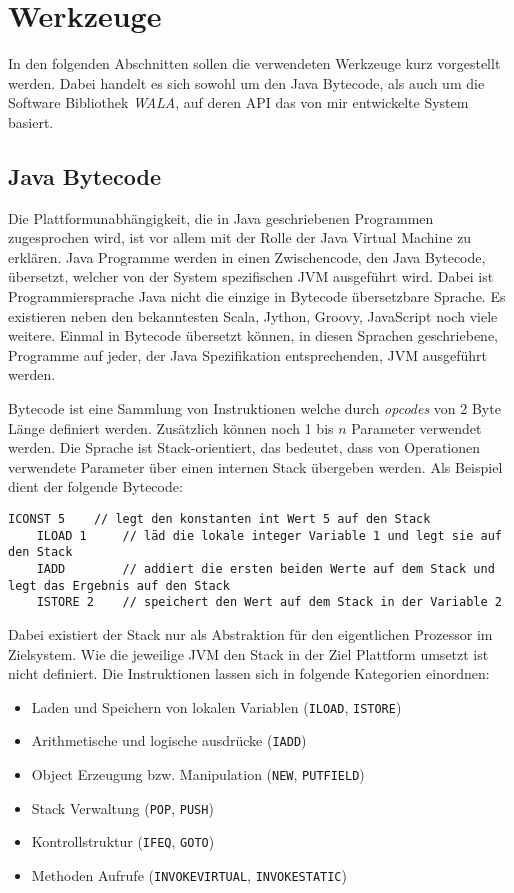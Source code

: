 \chapter{Werkzeuge}

In den folgenden Abschnitten sollen die verwendeten Werkzeuge kurz vorgestellt werden. Dabei handelt es 
sich sowohl um den Java Bytecode, als auch um die Software Bibliothek \textit{WALA}, auf deren API das 
von mir entwickelte System basiert. 

\section{Java Bytecode}

Die Plattformunabhängigkeit, die in Java geschriebenen Programmen zugesprochen wird, 
ist vor allem mit der Rolle der Java Virtual Machine zu erklären. Java Programme werden 
in einen Zwischencode, den Java Bytecode, übersetzt, welcher von der System spezifischen 
JVM ausgeführt wird. Dabei ist Programmiersprache Java nicht die einzige in Bytecode 
übersetzbare Sprache. Es existieren neben den bekanntesten Scala, Jython, Groovy,
JavaScript noch viele weitere. Einmal in Bytecode übersetzt können, in diesen Sprachen 
geschriebene, Programme auf jeder, der Java Spezifikation entsprechenden, JVM ausgeführt 
werden. 

Bytecode ist eine Sammlung von Instruktionen welche durch \textit{opcodes} von 2 Byte Länge definiert 
werden. Zusätzlich können noch 1 bis $n$ Parameter verwendet werden. Die Sprache ist Stack-orientiert, das 
bedeutet, dass von Operationen verwendete Parameter über einen internen Stack übergeben werden. Als Beispiel 
dient der folgende Bytecode:

\begin{lstlisting}[language=Bytecode]
	ICONST 5 	// legt den konstanten int Wert 5 auf den Stack 
	ILOAD 1		// läd die lokale integer Variable 1 und legt sie auf den Stack
	IADD 		// addiert die ersten beiden Werte auf dem Stack und legt das Ergebnis auf den Stack
	ISTORE 2	// speichert den Wert auf dem Stack in der Variable 2
\end{lstlisting} 

Dabei existiert der Stack nur als Abstraktion für den eigentlichen Prozessor im Zielsystem. Wie die 
jeweilige JVM den Stack in der Ziel Plattform umsetzt ist nicht definiert. Die Instruktionen lassen sich in 
folgende Kategorien einordnen:

\begin{itemize}
	\item Laden und Speichern von lokalen Variablen (\texttt{ILOAD}, \texttt{ISTORE})
	\item Arithmetische und logische ausdrücke (\texttt{IADD})
	\item Object Erzeugung bzw. Manipulation (\texttt{NEW}, \texttt{PUTFIELD})
	\item Stack Verwaltung (\texttt{POP}, \texttt{PUSH}) 
	\item Kontrollstruktur (\texttt{IFEQ}, \texttt{GOTO})
	\item Methoden Aufrufe (\texttt{INVOKEVIRTUAL}, \texttt{INVOKESTATIC})
\end{itemize}  


